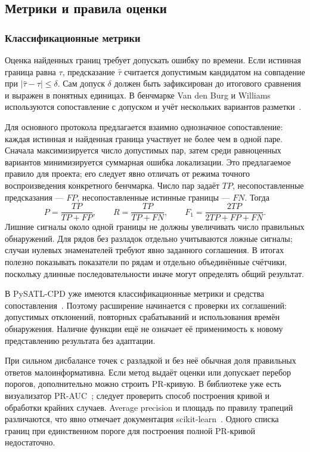 \subsection{Метрики и правила оценки}

\subsubsection{Классификационные метрики}

Оценка найденных границ требует допускать ошибку по времени.
Если истинная граница равна $\tau$, предсказание $\hat\tau$
считается допустимым кандидатом на совпадение при
$|\hat\tau-\tau|\leq\delta$. Сам допуск $\delta$ должен быть
зафиксирован до итогового сравнения и выражен в понятных единицах.
В бенчмарке Van den Burg и Williams используются сопоставление
с допуском и учёт нескольких вариантов разметки~\cite{vandenburg2022}.

Для основного протокола предлагается взаимно однозначное сопоставление:
каждая истинная и найденная граница участвует не более чем в одной
паре. Сначала максимизируется число допустимых пар, затем среди
равноценных вариантов минимизируется суммарная ошибка локализации.
Это предлагаемое правило для проекта; его следует явно отличать
от режима точного воспроизведения конкретного бенчмарка.
Число пар задаёт $TP$, несопоставленные предсказания --- $FP$,
несопоставленные истинные границы --- $FN$. Тогда
\[
 P=\frac{TP}{TP+FP},\qquad
 R=\frac{TP}{TP+FN},\qquad
 F_1=\frac{2TP}{2TP+FP+FN}.
\]
Лишние сигналы около одной границы не должны увеличивать число
правильных обнаружений. Для рядов без разладок отдельно учитываются
ложные сигналы; случаи нулевых знаменателей требуют явно
заданного соглашения. В итогах полезно показывать показатели
по рядам и отдельно объединённые счётчики, поскольку длинные
последовательности иначе могут определять общий результат.

В PySATL-CPD уже имеются классификационные метрики и средства
сопоставления~\cite{pysatl,pysatlmatching}. Поэтому расширение
начинается с проверки их соглашений: допустимых отклонений,
повторных срабатываний и использования времён обнаружения.
Наличие функции ещё не означает её применимость к новому
представлению результата без адаптации.

При сильном дисбалансе точек с разладкой и без неё обычная
доля правильных ответов малоинформативна. Если метод выдаёт
оценки или допускает перебор порогов, дополнительно можно строить
PR-кривую. В библиотеке уже есть визуализатор PR-AUC~\cite{pysatlpr};
следует проверить способ построения кривой и обработки крайних случаев.
Average precision и площадь по правилу трапеций различаются,
что явно отмечает документация scikit-learn~\cite{averageprecision}.
Одного списка границ при единственном пороге для построения
полной PR-кривой недостаточно.

